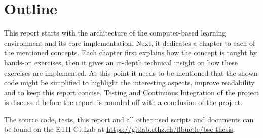 \section{Outline}

This report starts with the architecture of the computer-based learning environment and its core implementation. Next, it dedicates a chapter to each of the mentioned concepts. Each chapter first explains how the concept is taught by hands-on exercises, then it gives an in-depth technical insight on how these exercises are implemented. At this point it needs to be mentioned that the shown code might be simplified to highlight the interesting aspects, improve readability and to keep this report concise. Testing and Continuous Integration of the project is discussed before the report is rounded off with a conclusion of the project.

The source code, tests, this report and all other used scripts and documents can be found on the ETH GitLab at \url{https://gitlab.ethz.ch/flbuetle/bsc-thesis}.